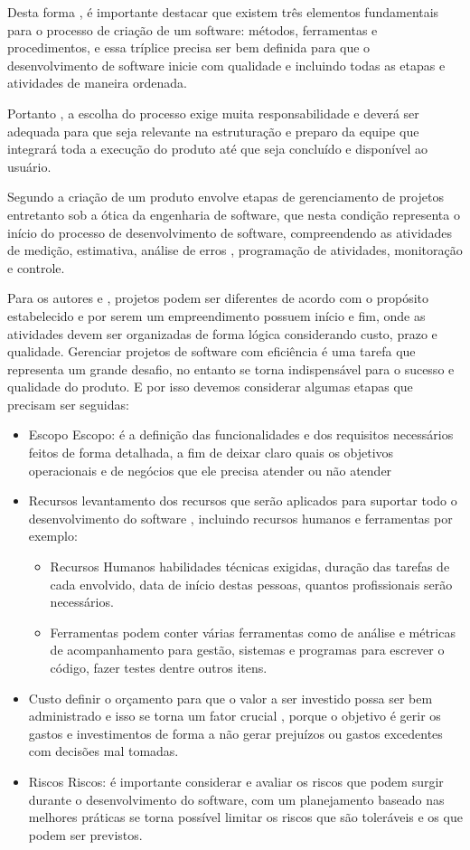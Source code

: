 \documentclass[
	12pt,				%
	oneside,			%
	a4paper,			%
  section=TITLE,
	brazil,				%
	]{abntex2}
\begin{document}
Desta forma , é importante destacar que existem três elementos fundamentais
para o processo de criação de um software: métodos, ferramentas e
procedimentos, e essa tríplice precisa ser bem definida para que o
desenvolvimento de software inicie com qualidade e incluindo todas as etapas e
atividades de maneira ordenada.

Portanto , a escolha do processo exige muita
responsabilidade e deverá ser adequada para que seja relevante na estruturação
e preparo da equipe que integrará toda a execução do produto até que seja
concluído e disponível ao usuário.

Segundo  \cite{pressman} a criação de um
produto envolve etapas de gerenciamento de projetos entretanto sob a ótica da
engenharia de software, que nesta condição representa o início do processo de
desenvolvimento de software, compreendendo as atividades de medição,
estimativa, análise de erros , programação de atividades, monitoração e
controle.

Para os autores \cite{de2011human} e \cite{do2015fundamentos} , projetos podem ser
diferentes de acordo com o propósito estabelecido e por serem um empreendimento
possuem início e fim, onde as atividades devem ser organizadas de forma lógica
considerando custo, prazo e qualidade.
Gerenciar projetos de software com
eficiência é uma tarefa que representa um grande desafio, no entanto se torna
indispensável para o sucesso e qualidade do produto.
E por isso devemos considerar algumas etapas que precisam ser seguidas:
\begin{itemize}
  \item{Escopo} Escopo: é a definição das funcionalidades e dos requisitos necessários
feitos de forma detalhada, a fim de deixar claro quais os objetivos operacionais e de
negócios que ele precisa atender ou não atender
  \item{Recursos} levantamento dos recursos que serão aplicados para
suportar todo o desenvolvimento do software , incluindo recursos humanos e
ferramentas por exemplo:
    \begin{itemize}
      \item{Recursos Humanos} habilidades técnicas exigidas, duração das
        tarefas de cada envolvido, data de início destas pessoas, quantos
        profissionais serão necessários.
      \item{Ferramentas}  podem conter várias ferramentas como de análise e
        métricas de acompanhamento para gestão, sistemas e programas para
        escrever o código, fazer testes dentre outros itens.
    \end{itemize}
  \item{Custo}  definir o orçamento para que o valor a ser investido possa ser
    bem administrado e isso se torna um fator crucial , porque o objetivo é
    gerir os gastos e investimentos de forma a não gerar prejuízos ou gastos
    excedentes com decisões mal tomadas.
  \item{Riscos} Riscos: é importante considerar e avaliar os riscos que podem surgir
durante o desenvolvimento do software, com um planejamento baseado nas melhores
práticas se torna possível limitar os riscos que são toleráveis e os que podem ser
previstos.
\end{itemize}
\end{document}
